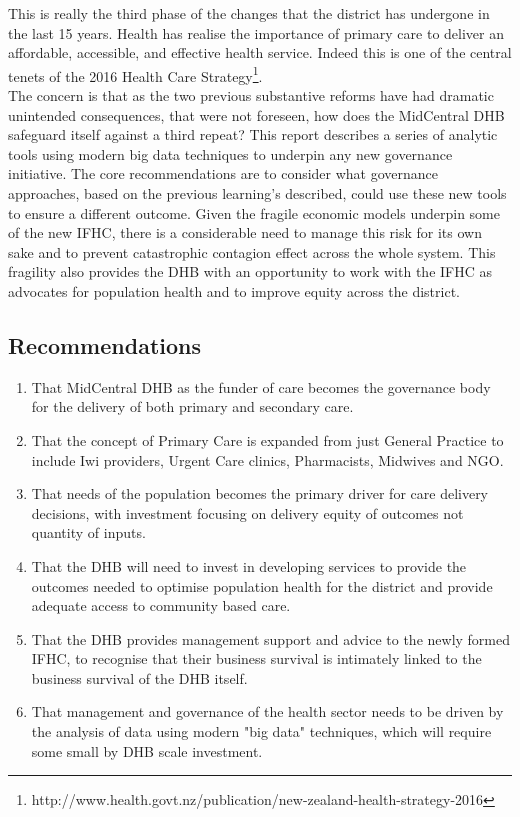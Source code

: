 \documentclass[11pt,a4paper]{article}
\begin{document}
This is really the third phase of the changes that the district has undergone in the last 15 years. Health has realise the importance of primary care to deliver an affordable, accessible, and effective health service. Indeed this is one of the central tenets of the 2016 Health Care Strategy\footnote{http://www.health.govt.nz/publication/new-zealand-health-strategy-2016}.\\

The concern is that as the two previous substantive reforms have had dramatic unintended consequences, that were not foreseen, how does the MidCentral DHB safeguard itself against a third repeat? This report describes a series of analytic tools using modern big data techniques to underpin any new governance initiative. The core recommendations are to consider what governance approaches, based on the previous learning's described, could use these new tools to ensure a different outcome. Given the fragile economic models underpin some of the new IFHC, there is a considerable need to manage this risk for its own sake and to prevent catastrophic contagion effect across the whole system. This fragility also provides the DHB with an opportunity to work with the IFHC as advocates for population health and to improve equity across the district.\\

\subsection{Recommendations}
 
\begin{enumerate}
\item That MidCentral DHB as the funder of care becomes the governance body for the delivery of both primary and secondary care.
\item That the concept of Primary Care is expanded from just General Practice to include Iwi providers, Urgent Care clinics, Pharmacists, Midwives and NGO.
\item That needs of the population becomes the primary driver for care delivery decisions, with investment focusing on delivery equity of outcomes not quantity of inputs. 
\item That the DHB will need to invest in developing services to provide the outcomes needed to optimise population health for the district and provide adequate access to community based care.
\item That the DHB provides management support and advice to the newly formed IFHC, to recognise that their business survival is intimately linked to the business survival of the DHB itself.
\item That management and governance of the health sector needs to be driven by the analysis of data using modern "big data" techniques, which will require some small by DHB scale investment.
 
\end{enumerate}
\pagebreak
\end{document}
